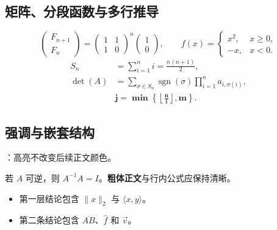 \documentclass{article}
\begin{document}
\subsection{矩阵、分段函数与多行推导}
\[
 \begin{pmatrix}F_{n+1}\\F_n\end{pmatrix}
 =\begin{pmatrix}1&1\\1&0\end{pmatrix}^{n}
 \begin{pmatrix}1\\0\end{pmatrix},\qquad
 f(x)=\begin{cases}x^2,&x\geq0,\\-x,&x<0.\end{cases}
\]
\begin{align*}
 S_n&=\sum_{i=1}^{n}i=\frac{n(n+1)}{2},\\
 \det(A)&=\sum_{\sigma\in S_n}\operatorname{sgn}(\sigma)
                 \prod_{i=1}^{n}a_{i,\sigma(i)},\\
 &\boldsymbol{j=\min\left\{\left\lfloor\frac{n}{i}\right\rfloor,m\right\}}.
\end{align*}
\subsection{强调与嵌套结构}
：高亮不改变后续正文颜色。
\begin{quoteblock}
若 $A$ 可逆，则 $A^{-1}A=I$。\textbf{粗体正文}与行内公式应保持清晰。
\begin{itemize}
\item 第一层结论包含 $\lVert x\rVert_2$ 与 $\langle x,y\rangle$。
\item 第二条结论包含 $\overline{AB}$、$\widehat{f}$ 和 $\vec{v}$。
\end{itemize}
\end{quoteblock}
\end{document}
